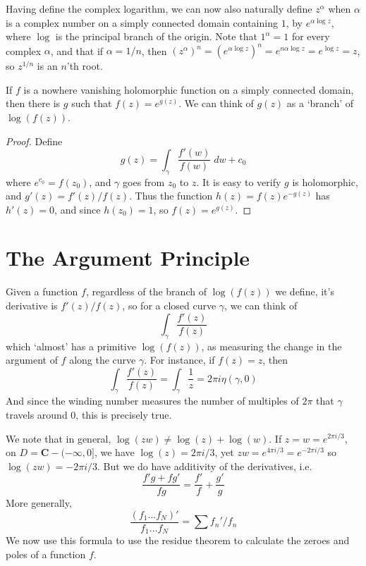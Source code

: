 Having define the complex logarithm, we can now also naturally define $z^\alpha$ when $\alpha$ is a complex number on a simply connected domain containing $1$, by $e^{\alpha \log z}$, where $\log$ is the principal branch of the origin. Note that $1^\alpha = 1$ for every complex $\alpha$, and that if $\alpha = 1/n$, then $(z^\alpha)^n = (e^{\alpha \log z})^n = e^{n \alpha \log z} = e^{\log z} = z$, so $z^{1/n}$ is an $n$'th root.

\begin{theorem}
    If $f$ is a nowhere vanishing holomorphic function on a simply connected domain, then there is $g$ such that $f(z) = e^{g(z)}$. We can think of $g(z)$ as a `branch' of $\log(f(z))$.
\end{theorem}
\begin{proof}
    Define
    \[ g(z) = \int_\gamma \frac{f'(w)}{f(w)}\; dw + c_0 \]
    where $e^{c_0} = f(z_0)$, and $\gamma$ goes from $z_0$ to $z$. It is easy to verify $g$ is holomorphic, and $g'(z) = f'(z)/f(z)$. Thus the function $h(z) = f(z)e^{-g(z)}$ has $h'(z) = 0$, and since $h(z_0) = 1$, so $f(z) = e^{g(z)}$.
\end{proof}

\section{The Argument Principle}

Given a function $f$, regardless of the branch of $\log(f(z))$ we define, it's derivative is $f'(z)/f(z)$, so for a closed curve $\gamma$, we can think of
%
\[ \int_\gamma \frac{f'(z)}{f(z)} \]
%
which `almost' has a primitive $\log(f(z))$, as measuring the change in the argument of $f$ along the curve $\gamma$. For instance, if $f(z) = z$, then
%
\[ \int_\gamma \frac{f'(z)}{f(z)} = \int_\gamma \frac{1}{z} = 2 \pi i \eta(\gamma,0) \]
%
And since the winding number measures the number of multiples of $2\pi$ that $\gamma$ travels around $0$, this is precisely true.

We note that in general, $\log(zw) \neq \log(z) + \log(w)$. If $z = w = e^{2 \pi i/3}$, on $D = \mathbf{C} - (-\infty,0]$, we have $\log(z) = 2 \pi i/3$, yet $zw = e^{4 \pi i /3} = e^{- 2 \pi i /3}$ so $\log(zw) = -2 \pi i /3$. But we do have additivity of the derivatives, i.e.
%
\[ \frac{f'g + fg'}{fg} = \frac{f'}{f} + \frac{g'}{g} \]
%
More generally,
%
\[ \frac{(f_1 \dots f_N)'}{f_1 \dots f_N} = \sum f_n'/f_n \]
%
We now use this formula to use the residue theorem to calculate the zeroes and poles of a function $f$.

